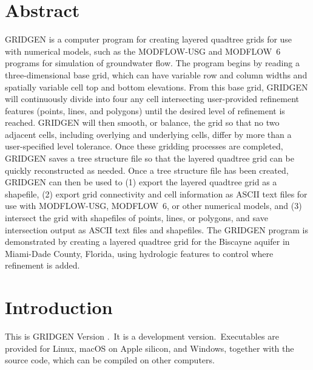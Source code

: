 \documentclass[11pt,twoside,twocolumn]{usgsreport}
\begin{document}
{\renewcommand{\coverruleoddpage}{}\renewcommand{\USGSvisidname}{blank}%
 \renewcommand{\doiagency}{}\renewcommand{\textusgs}{}%
 \ifdef{\makefrontcoveralt}{\makefrontcoveralt}{\makefrontcover}}
\ifdef{\makefrontmatterabv}{\makefrontmatterabv}{\makefrontmatter}

\onecolumn
\pagestyle{body}
\RaggedRight
\setlength{\parindent}{2em}

\section*{Abstract}

GRIDGEN is a computer program for creating layered quadtree grids for use with numerical models, such as the MODFLOW-USG \citep{modflowusg} and MODFLOW~6 \citep{modflow6gwf} programs for simulation of groundwater flow. The program begins by reading a three-dimensional base grid, which can have variable row and column widths and spatially variable cell top and bottom elevations. From this base grid, GRIDGEN will continuously divide into four any cell intersecting user-provided refinement features (points, lines, and polygons) until the desired level of refinement is reached. GRIDGEN will then smooth, or balance, the grid so that no two adjacent cells, including overlying and underlying cells, differ by more than a user-specified level tolerance. Once these gridding processes are completed, GRIDGEN saves a tree structure file so that the layered quadtree grid can be quickly reconstructed as needed. Once a tree structure file has been created, GRIDGEN can then be used to (1) export the layered quadtree grid as a shapefile, (2) export grid connectivity and cell information as ASCII text files for use with MODFLOW-USG, MODFLOW~6, or other numerical models, and (3) intersect the grid with shapefiles of points, lines, or polygons, and save intersection output as ASCII text files and shapefiles. The GRIDGEN program is demonstrated by creating a layered quadtree grid for the Biscayne aquifer in Miami-Dade County, Florida, using hydrologic features to control where refinement is added.

\section{Introduction}

This is GRIDGEN Version \gridgenversion.\ifdevelopmode\ It is a development version.\fi\ Executables are provided for Linux, macOS on Apple silicon, and Windows, together with the source code, which can be compiled on other computers.
\end{document}
